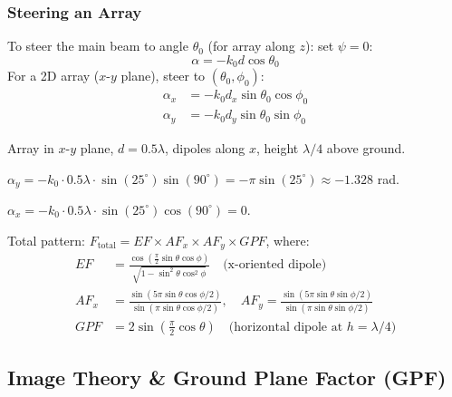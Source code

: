 \documentclass[10pt,letterpaper]{article}
\newcommand{\xhat}{\hat{x}}
\newcommand{\degrees}{^{\circ}}
\begin{document}
\subsubsection{Steering an Array}
To steer the main beam to angle $\theta_0$ (for array along $z$): set $\psi = 0$:
\begin{equation}
  \alpha = -k_0 d\cos\theta_0
\end{equation}
For a 2D array ($x$-$y$ plane), steer to $(\theta_0, \phi_0)$:
\begin{align}
  \alpha_x &= -k_0 d_x\sin\theta_0\cos\phi_0 \\
  \alpha_y &= -k_0 d_y\sin\theta_0\sin\phi_0
\end{align}

\begin{tcolorbox}[examplebox, title={HW3 P4 Example: 5$\times$5 Array, Steer to $\theta=25\degrees$, $\phi=90\degrees$}]
Array in $x$-$y$ plane, $d = 0.5\lambda$, dipoles along $\xhat$, height $\lambda/4$ above ground.

$\alpha_y = -k_0\cdot 0.5\lambda\cdot\sin(25\degrees)\sin(90\degrees) = -\pi\sin(25\degrees) \approx -1.328$ rad.

$\alpha_x = -k_0\cdot 0.5\lambda\cdot\sin(25\degrees)\cos(90\degrees) = 0$.

Total pattern: $F_\mathrm{total} = EF\times AF_x\times AF_y\times GPF$, where:
\begin{align*}
  EF &= \frac{\cos(\frac{\pi}{2}\sin\theta\cos\phi)}{\sqrt{1-\sin^2\theta\cos^2\phi}} \quad\text{(x-oriented dipole)} \\
  AF_x &= \frac{\sin(5\pi\sin\theta\cos\phi/2)}{\sin(\pi\sin\theta\cos\phi/2)}, \quad AF_y = \frac{\sin(5\pi\sin\theta\sin\phi/2)}{\sin(\pi\sin\theta\sin\phi/2)} \\
  GPF &= 2\sin\!\left(\frac{\pi}{2}\cos\theta\right) \quad\text{(horizontal dipole at $h=\lambda/4$)}
\end{align*}
\end{tcolorbox}

\subsection{Image Theory \& Ground Plane Factor (GPF)}
\end{document}
